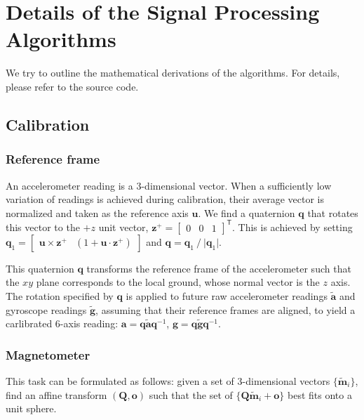 \documentclass{nime-alternate} %
\begin{document}

 

\appendix
\section{Details of the Signal Processing Algorithms}
\label{appendix:signal-processing}
We try to outline the mathematical derivations of the algorithms. For details, please refer to the source code.

\subsection{Calibration}
\subsubsection{Reference frame}
\label{appendix:calib-ori}
An accelerometer reading is a 3-dimensional vector. When a sufficiently low variation of readings is achieved during calibration, their average vector is normalized and taken as the reference axis $\mathbf{u}$. We find a quaternion $\mathbf{q}$ that rotates this vector to the $+z$ unit vector, $\mathbf{z}^+ = \begin{bmatrix} 0 & 0 & 1 \end{bmatrix}^\mathsf{T}$. This is achieved by setting $\mathbf{q}_1 = \begin{bmatrix} \mathbf{u} \times \mathbf{z^+} & (1 + \mathbf{u} \cdot \mathbf{z^+}) \end{bmatrix}$ and $\mathbf{q} = \mathbf{q}_1 \mathbin{\mathop{/}} \lvert \mathbf{q}_1 \rvert$.

This quaternion $\mathbf{q}$ transforms the reference frame of the accelerometer such that the $xy$ plane corresponds to the local ground, whose normal vector is the $z$ axis. The rotation specified by $\mathbf{q}$ is applied to future raw accelerometer readings $\tilde{\mathbf{a}}$ and gyroscope readings $\tilde{\mathbf{g}}$, assuming that their reference frames are aligned, to yield a carlibrated 6-axis reading:
$\mathbf{a} = \mathbf{q} \tilde{\mathbf{a}} \mathbf{q}^{-1}$, $\mathbf{g} = \mathbf{q} \tilde{\mathbf{g}} \mathbf{q}^{-1}$.

\subsubsection{Magnetometer}
\label{appendix:calib-mag}
This task can be formulated as follows: given a set of 3-dimensional vectors $\{ \tilde{\mathbf{m}}_i \}$, find an affine transform $(\mathbf{Q}, \mathbf{o})$ such that the set of $\{\mathbf{Q} \tilde{\mathbf{m}}_i + \mathbf{o}\}$ best fits onto a unit sphere.
\end{document}
